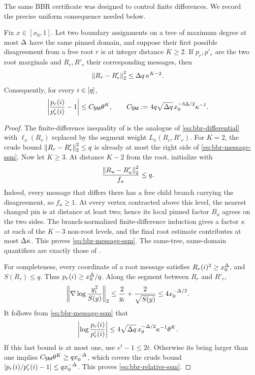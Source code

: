 The same BBR certificate was designed to control finite differences.  We
record the precise uniform consequence needed below.

\begin{lemma}
\label{lem:bbr-tree-ssm}
Fix \(x\in[x_0,1]\).  Let two boundary assignments on a tree of maximum
degree at most \(\Delta\) have the same pinned domain, and
suppose their first possible disagreement from a free root \(r\) is at
integer distance \(K\ge2\).  If \(p_r,p'_r\) are the two root marginals and
\(R_r,R'_r\) their corresponding messages, then
\begin{equation}
 \left\|R_r-R'_r\right\|_2^2\le\Delta q\,\kappa^{K-2}.
 \label{eq:bbr-message-ssm}
\end{equation}
Consequently, for every \(i\in[q]\),
\begin{equation}
 \left|\frac{p_r(i)}{p'_r(i)}-1\right|
 \le C_{\mathsf{SM}}\theta^K,
 \qquad
 C_{\mathsf{SM}}
 :=4q\sqrt{\Delta q}\,x_0^{-3\Delta/2}\kappa^{-1}.
 \label{eq:bbr-relative-ssm}
\end{equation}
\end{lemma}

\begin{proof}
The finite-difference inequality of
\cite[Theorem~2.5]{BencsBerrekkalRegts2025Trees} is the analogue of
\eqref{eq:bbr-differential} with
\(\ell_x(R_v)\) replaced by the segment weight \(L_x(R_v,R'_v)\).
For \(K=2\), the crude bound \(\left\|R_r-R'_r\right\|_2^2\le q\) is already at
most the right side of \eqref{eq:bbr-message-ssm}.  Now let \(K\ge3\).
At distance \(K-2\) from the root, initialize with
\[
  \frac{\left\|R_u-R'_u\right\|_2^2}{f_u}\le q.
\]
Indeed, every message that differs there has a free child branch carrying
the disagreement, so \(f_u\ge1\).  At every vertex contracted above this
level, the nearest changed pin is at distance at least two; hence its local
pinned factor \(B_u\) agrees on the two sides.  The branch-normalized
finite-difference induction gives a factor \(\kappa\) at each of the
\(K-3\) non-root levels, and the final root estimate contributes at most
\(\Delta\kappa\).  This proves
\eqref{eq:bbr-message-ssm}.  The same-tree, same-domain quantifiers are
exactly those of .

For completeness, every coordinate of a root message satisfies
\(R_r(i)^2\ge x_0^\Delta\), and \(S(R_r)\le q\).  Thus
\(p_r(i)\ge x_0^\Delta/q\).  Along the segment between \(R_r\) and \(R'_r\),
\[
 \left\|\nabla\log\frac{y_i^2}{S(y)}\right\|_2
 \le\frac2{y_i}+\frac2{\sqrt{S(y)}}
 \le4x_0^{-\Delta/2}.
\]
It follows from \eqref{eq:bbr-message-ssm} that
\[
 \left|\log\frac{p_r(i)}{p'_r(i)}\right|
 \le4\sqrt{\Delta q}\,x_0^{-\Delta/2}\kappa^{-1}\theta^K.
\]
If this last bound is at most one, use \(e^t-1\le2t\).  Otherwise its
being larger than one implies
\(C_{\mathsf{SM}}\theta^K\ge qx_0^{-\Delta}\), which covers the crude bound
\(\left|p_r(i)/p'_r(i)-1\right|\le qx_0^{-\Delta}\).  This proves
\eqref{eq:bbr-relative-ssm}.
\end{proof}

